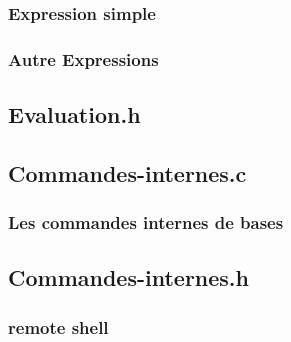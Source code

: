 \documentclass[12pt]{article}
\begin{document}
\subsubsection{Expression simple}
\label{expr_simple}
\begin{alltt}
 
\end{alltt}

\subsubsection{Autre Expressions}
\label{autre expression}
\begin{alltt}
 
\end{alltt}

\subsection{Evaluation.h}
\label{Eval.h}
\begin{alltt}
 
\end{alltt}

\subsection{Commandes-internes.c}

\subsubsection{Les commandes internes de bases}
\label{cmd_de_base}
\begin{alltt}
 
\end{alltt}

\subsection{Commandes-internes.h}
\label{cmd_interne.h}
\begin{alltt}
 
\end{alltt}

\subsubsection{remote shell}
\label{remote shell}
\begin{alltt}
 
\end{alltt}
\end{document}

